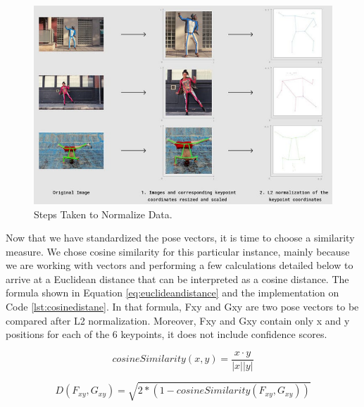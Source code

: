 

\begin{figure}[ht]
  \centering
  \includegraphics[scale=0.9]{gambar/two-steps.png}
  \caption{Steps Taken to Normalize Data.}
  \label{fig:steps-to-normalize}
\end{figure}

Now that we have standardized the pose vectors, it is time to choose a similarity measure. We chose cosine similarity for this particular instance, mainly because we are working with vectors and performing a few calculations detailed below to arrive at a Euclidean distance that can be interpreted as a cosine distance.
The formula shown in Equation \ref{eq:euclideandistance} and the implementation on Code \ref{lst:cosinedistane}.
In that formula, Fxy and Gxy are two pose vectors to be compared after L2 normalization. Moreover, Fxy and Gxy contain only x and y positions for each of the 6 keypoints, it does not include confidence scores.

\begin{equation}
  \label{eq:cosinesimilarity}
  cosineSimilarity(x,y) = \frac{x \cdot y}{|x||y|}
\end{equation}

\begin{equation}
  \label{eq:euclideandistance}
  D(F_{xy}, G_{xy}) = \sqrt{2 * (1 - cosineSimilarity(F_{xy}, G_{xy}))}
\end{equation}



